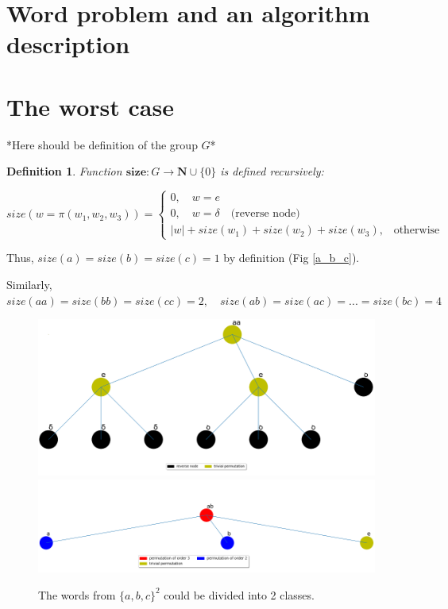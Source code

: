 \documentclass{article}
\newtheorem{definition}{Definition}[section]
\begin{document}
\newpage 

\section{Word problem and an algorithm description}




\section{The worst case}

*Here should be definition of the group $G$*

\theoremstyle{definition}
\begin{definition}
	 Function $\textbf{size} : G \rightarrow \mathbf{N} \cup \{0\}$ is defined recursively:
	
	\begin{equation} 
	size(w = \pi (w_1, w_2, w_3)) =
	\begin{cases}
	0, \quad  w = e \\
	0, \quad  w = \delta \quad \text{(reverse node)} \\
	|w| + size(w_1) + size(w_2) + size(w_3)\text{,} \quad \text{otherwise}
	\end{cases}
	\end{equation}
\end{definition}



Thus, $size(a) = size(b) = size(c) = 1$ by definition (Fig \ref{a_b_c}).

Similarly, $size(aa) = size(bb) = size(cc) = 2, \quad size(ab) = size(ac) = ... = size(bc) = 4$

\begin{figure}[h]
	\centering
	\includegraphics[scale=0.25]{../graphs/aa.png}
	\includegraphics[scale=0.25]{../graphs/ab.png}
	\caption{The words from $\{a, b, c\}^2$ could be divided into 2 classes.}
	\label{second_order}
\end{figure}
\end{document}

